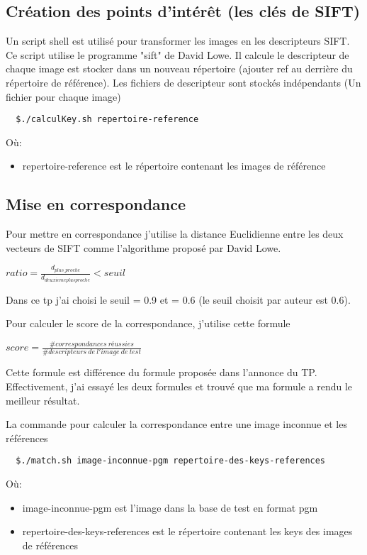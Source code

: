 \documentclass[french,12pt,a4paper,oneside,notitlepage]{report}
\begin{document}
\subsection{Création des points d'intérêt (les clés de SIFT)}
Un script shell est utilisé pour transformer les images en les descripteurs SIFT. Ce 
script utilise le programme "sift" de David Lowe. Il calcule le descripteur de chaque 
image est stocker dans un nouveau répertoire (ajouter ref au derrière du répertoire de 
référence). Les fichiers de descripteur sont stockés indépendants (Un fichier pour chaque 
image)
\begin{lstlisting}
  $./calculKey.sh repertoire-reference
\end{lstlisting}
Où:
\begin{itemize}
 \item repertoire-reference est le répertoire contenant les images de référence
\end{itemize}

\subsection{Mise en correspondance}
Pour mettre en correspondance j'utilise la distance Euclidienne
entre les deux vecteurs de SIFT comme l'algorithme proposé par David Lowe.
\begin{center}
	$ratio = \frac{d_{plus\_proche}}{d_{deuxieme plus proche}} < seuil$
\end{center}

Dans ce tp j'ai choisi le seuil = 0.9 et = 0.6 (le seuil choisit par auteur est 0.6). 

Pour calculer le score de la correspondance, j'utilise cette formule
\begin{center}
 $score = \frac{\#  correspondances\ réussies}{\# descripteurs\ de\ l'image\ de\ test}$
\end{center}

Cette formule est différence du formule proposée dans l'annonce du TP. Effectivement, j'ai essayé
les deux formules et trouvé que ma formule a rendu le meilleur résultat.

La commande pour calculer la correspondance entre une image inconnue et les références 
\begin{lstlisting}
  $./match.sh image-inconnue-pgm repertoire-des-keys-references 
\end{lstlisting}
Où:
\begin{itemize}
 \item image-inconnue-pgm est l'image dans la base de test en format pgm
 \item repertoire-des-keys-references est le répertoire contenant les keys des images de références 
\end{itemize}
\end{document}
